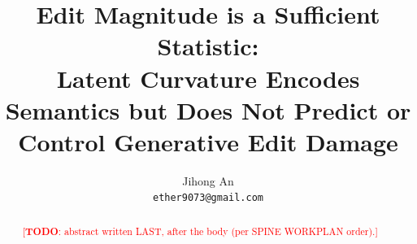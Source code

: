 \documentclass[11pt]{article}
\title{Edit Magnitude is a Sufficient Statistic:\\
       Latent Curvature Encodes Semantics but Does Not Predict or\\
       Control Generative Edit Damage}
\author{Jihong An \\ \texttt{ether9073@gmail.com}}
\date{}
\newcommand{\todo}[1]{\textcolor{red}{[\textbf{TODO}: #1]}}
\begin{document}
\maketitle

\begin{abstract}
\todo{abstract written LAST, after the body (per SPINE WORKPLAN order).}
\end{abstract}











% 
% 
\end{document}

